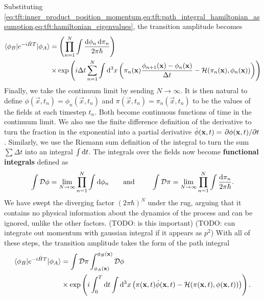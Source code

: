Substituting \cref{eq:tft:inner_product_position_momentum,eq:tft:path_integral_hamiltonian_assumption,eq:tft:hamiltonian_eigenvalues}, the transition amplitude becomes
\begin{equation}
\begin{split}
	\braket{\phi_B | e^{- i \hat{H} T} | \phi_A} &=      \left( \prod_{n=1}^N \int \frac{\mathop{}\!\mathrm{d} \phi_n \mathop{}\!\mathrm{d} \pi_n}{2 \pi \hbar} \right) \\
	           &\times \exp \left( i \Delta t \sum_{n=1}^N \int \mathop{}\!\mathrm{d}^3 x \left( \pi_n(\mathbf{x}) \frac{\phi_{n+1}(\mathbf{x}) - \phi_n(\mathbf{x})}{\Delta t} - \mathcal{H}(\pi_n(\mathbf{x}), \phi_n(\mathbf{x})) \right)
	\right)
\end{split}
\end{equation}
Finally, we take the continuum limit by sending $N \rightarrow \infty$.
It is then natural to define
$\phi(\vec{x}, t_n) = \phi_n(\vec{x}, t_n)$
and
$\pi(\vec{x}, t_n) = \pi_n(\vec{x}, t_n)$
to be the values of the fields at each timestep $t_n$.
Both become continuous functions of time in the continuum limit.
We also use the finite difference definition of the derivative to turn the fraction in the exponential into a partial derivative $\dot{\phi}(\mathbf{x},t) = \pdv{\phi(\mathbf{x},t)}/{t}$.
Similarly, we use the Riemann sum definition of the integral to turn the sum $\sum \Delta t$ into an integral $\int \mathop{}\!\mathrm{d} t$.
The integrals over the fields now become \textbf{functional integrals} defined as
\begin{equation}
	\int \pathintdif \phi = \lim_{N \rightarrow \infty} \prod_{n=1}^{N} \int \dif \phi_n
	\qquad \text{and} \qquad
	\int \pathintdif \pi = \lim_{N \rightarrow \infty} \prod_{n=1}^{N} \int \frac{\dif \pi_n}{2 \pi \hbar} .
\end{equation}
We have swept the diverging factor $(2 \pi \hbar)^N$ under the rug, arguing that it contains no physical information about the dynamics of the process and can be ignored, unlike the other factors.
(TODO: is this important)
(TODO: can integrate out momentum with gaussian integral if it appears as $p^2$)
With all of these steps, the transition amplitude takes the form of the path integral
\begin{equation}
\begin{split}
	\braket{\phi_B | e^{- i \hat{H} T} | \phi_A} &=      \int \mathcal{D} \pi \int_{\phi_A(\mathbf{x})}^{\phi_B(\mathbf{x})} \mathcal{D} \phi \\
	           &\times \exp \left( i \int_0^T \mathop{}\!\mathrm{d} t \int \mathop{}\!\mathrm{d}^3 x \left( \pi(\mathbf{x}, t) \dot{\phi}(\mathbf{x}, t) - \mathcal{H}(\pi(\mathbf{x}, t), \phi(\mathbf{x}, t)) \right) \right) .
\end{split}
\label{eq:tft:path_integral_hamiltonian}
\end{equation}
